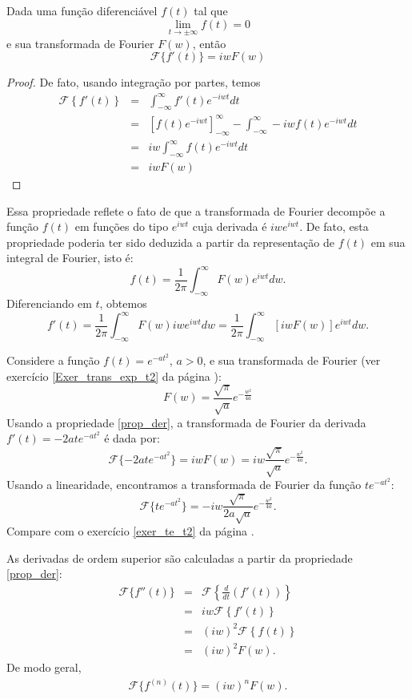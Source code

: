 \begin{propr}{\label{prop_der}} Dada uma função diferenciável $f(t)$ tal que 
$$\lim_{t\to \pm \infty}f(t)=0
$$
e sua transformada de Fourier $F(w)$, então
$$
\mathcal{F}\{f'(t)\}=iw F(w)
$$
\end{propr}
\begin{proof}
De fato, usando integração por partes, temos
\begin{eqnarray*}
\mathcal{F}\left\{f'(t)\right\}&=&\int_{-\infty}^\infty  f'(t)e^{-iwt}dt \\
&=&\left[f(t)e^{-iwt}\right]_{-\infty}^\infty- \int_{-\infty}^\infty  -iw f(t)e^{-iwt}dt \\
&=&iw\int_{-\infty}^\infty   f(t)e^{-iwt}dt \\
&=&iwF(w) 
\end{eqnarray*}
\end{proof}
\begin{obs}Essa propriedade reflete o fato de que a transformada de Fourier decompõe a função $f(t)$ em funções do tipo $e^{iwt}$ cuja derivada é $iwe^{iwt}$. De fato, esta propriedade poderia ter sido deduzida a partir da representação de $f(t)$ em sua integral de Fourier, isto é:
$$
f(t)=\frac{1}{2\pi}\int_{-\infty}^\infty F(w)e^{iwt}dw.
$$
Diferenciando em $t$, obtemos
$$
f'(t)=\frac{1}{2\pi}\int_{-\infty}^\infty F(w)iwe^{iwt}dw=\frac{1}{2\pi}\int_{-\infty}^\infty \left[iwF(w)\right]e^{iwt}dw.
$$
\end{obs}
\begin{ex}{\label{ex_exp_t2}}Considere a função $f(t)=e^{-at^2}$, $a>0$, e sua transformada de Fourier (ver exercício \ref{Exer_trans_exp_t2} da página \pageref{Exer_trans_exp_t2}):
$$
F(w)=\frac{\sqrt{\pi}}{\sqrt{a}}e^{-\frac{w^2}{4a}}
$$
Usando a propriedade \ref{prop_der}, a transformada de Fourier da derivada $f'(t)=-2 a t e^{-at^2}$ é dada por:
$$
\mathcal{F}\{-2 a t e^{-at^2} \}=iwF(w)=iw\frac{\sqrt{\pi}}{\sqrt{a}}e^{-\frac{w^2}{4a}}.
$$
Usando a linearidade, encontramos a transformada de Fourier da função $t e^{-at^2}$:
$$
\mathcal{F}\{  t e^{-at^2} \}=-iw\frac{\sqrt{\pi}}{2a\sqrt{a}}e^{-\frac{w^2}{4a}}.
$$
Compare com o exercício \ref{exer_te_t2} da página \pageref{exer_te_t2}.
\end{ex}
\begin{obs}As derivadas de ordem superior são calculadas a partir da propriedade \ref{prop_der}:
\begin{eqnarray*}
\mathcal{F}\{f''(t)\}&=&\mathcal{F}\left\{\frac{d}{dt}\left(f'(t)\right)\right\}\\
&=&iw\mathcal{F}\left\{f'(t)\right\}\\
&=&(iw)^2\mathcal{F}\left\{f(t)\right\}\\
&=&(iw)^2F(w).
\end{eqnarray*}
De modo geral,
\begin{eqnarray*}
\mathcal{F}\{f^{(n)}(t)\}=(iw)^nF(w).
\end{eqnarray*}

\end{obs}
